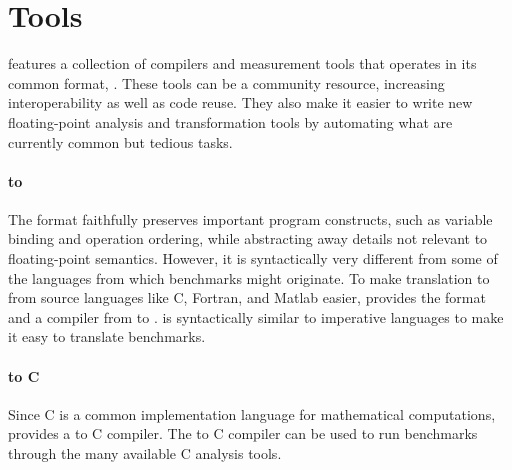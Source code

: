 \documentclass[main.tex]{subfiles}
\begin{document}
\section{Tools}
\label{sec:tools}

\name features
  a collection of compilers and measurement tools
  that operates in its common format, \core.
These tools can be a community resource,
  increasing interoperability as well as code reuse.
They also make it easier to write
  new floating-point analysis and transformation tools
  by automating what are currently
  common but tedious tasks.

\paragraph{\surface to \core}
The \core format faithfully preserves important program constructs,
  such as variable binding and operation ordering,
  while abstracting away details not relevant
  to floating-point semantics.
However, it is syntactically very different
  from some of the languages from which benchmarks might originate.
To make translation to \core from source languages
  like C, Fortran, and Matlab easier,
  \name provides the \surface format
  and a compiler from \surface to \core.
\surface is syntactically similar to imperative languages
  to make it easy to translate benchmarks.

\paragraph{\core to C}
Since C is a common implementation language for mathematical computations,
  \name provides a \core to C compiler.
The \core to C compiler can be used to run \core benchmarks
  through the many available C analysis tools.

\begin{comment}
\paragraph{Worst-case error estimation}
\name provides a tool to give bounds on
  the worst-case absolute errors of a \core program
  using an abstract interpretation based on interval analysis
  following the approach pioneered by Martel et~al.~\cite{fmics15}.
The error analysis is fast
  and applies to loops without the need for loop invariants,
  though specialized tools such as Rosa~\cite{DarulovaK14}
  and FPTaylor~\cite{fptaylor-fm15}
  provide tighter error bounds.
For tools that improve the accuracy of floating-point computations,
  the static error analysis is a way to compare
  the original and improved computation,
  while tools that optimize programs given accuracy bounds
  can use the static analysis to derive the accuracy bounds demanded.
\end{comment}
\end{document}
